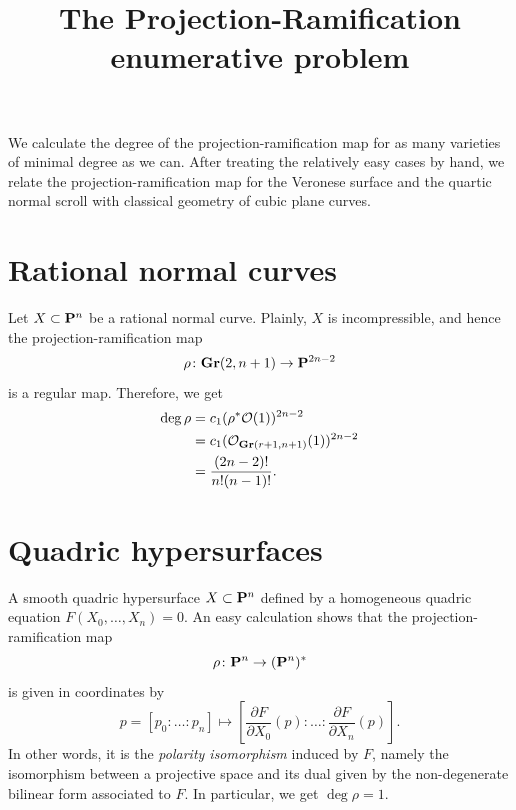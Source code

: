 \documentclass{amsart}
\title{The Projection-Ramification enumerative problem}
\renewcommand {\P}{{\bf P}}
\providecommand {\Gr}{{\bf Gr}}
\providecommand {\from}{{\colon}}
\numberwithin{equation}{section}
\renewcommand{\O}{\mathcal O}
\begin{document}
\maketitle
We calculate the degree of the projection-ramification map for as many varieties of minimal degree as we can.
After treating the relatively easy cases by hand, we relate the projection-ramification map for the Veronese surface and the quartic normal scroll with classical geometry of cubic plane curves.

\section{Rational normal curves}
\label{sec:arnc}
Let $X \subset \P^n$ be a rational normal curve.
Plainly, $X$ is incompressible, and hence the projection-ramification map
\[ \rho \from \Gr(2, n+1) \to \P^{2n-2}\]
is a regular map.
Therefore, we get
\begin{align*}
  \deg \rho &= c_1(\rho^* \O(1))^{2n-2}\\
            &= c_1(\O_{\Gr(r+1, n+1)}(1))^{2n-2} \\
            &= \frac{(2n-2)!}{n!(n-1)!}.
\end{align*}

\section{Quadric hypersurfaces} %
\label{sec:aquadricsurface}
A smooth quadric hypersurface $X \subset \P^{n}$ defined by a homogeneous quadric equation $F(X_{0},\dots,X_n) = 0$.
An easy calculation shows that the projection-ramification map
\[ \rho \from \P^n \to (\P^n)^*\]
is given in coordinates by
\[ p = [p_0: \dots:p_n] \mapsto \left[ \frac{\partial F}{\partial X_0}(p): \dots: \frac{\partial F}{\partial X_n}(p) \right].\]
In other words, it is the \emph{polarity isomorphism} induced by $F$, namely the isomorphism between a projective space and its dual given by the non-degenerate bilinear form associated to $F$.
In particular, we get $\deg \rho = 1$.
\end{document}
